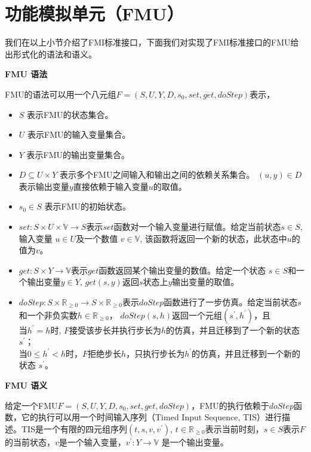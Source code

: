\section{功能模拟单元（FMU）}
我们在以上小节介绍了FMI标准接口，下面我们对实现了FMI标准接口的FMU给出形式化的语法和语义。
\begin{define}
\textbf{FMU 语法}

FMU的语法可以用一个八元组$F=(S,U,Y,D,s_{0},set,get,doStep)$表示，
\end{define}
\begin{itemize}
\item
$S$ 表示FMU的状态集合。
\item
$U$ 表示FMU的输入变量集合。
\item
$Y$ 表示FMU的输出变量集合。
\item
$D \subseteq U \times Y$ 表示多个FMU之间输入和输出之间的依赖关系集合。 $(u,y) \in D $表示输出变量$y$直接依赖于输入变量$u$的取值。 
\item
$s_{0} \in S$ 表示FMU的初始状态。
\item
$set : S \times U \times \mathbb{V} \rightarrow S$表示$set$函数对一个输入变量进行赋值。给定当前状态$s \in S$, 输入变量 $u \in U$及一个数值 $v \in \mathbb{V}$, 该函数将返回一个新的状态，此状态中$u$的值为$v$。
\item
$get : S \times Y \rightarrow \mathbb{V}$表示$get$函数返回某个输出变量的数值。给定一个状态 $s \in S$和一个输出变量$y \in Y$, $get(s,y)$返回$s$状态上$y$输出变量的取值。
\item
$doStep : S \times \mathbb{R}_{\geqslant{0}} \rightarrow S \times \mathbb{R}_{\geqslant{0}}$表示$doStep$函数进行了一步仿真。给定当前状态$s$和一个非负实数$h \in \mathbb{R}_{\geqslant{0}}$， $doStep(s,h)$返回一个元组$(s^{\prime},h^{\prime})$，且
\\
    当$h^{\prime} = h$时, $F$接受该步长并执行步长为$h$的仿真，并且迁移到了一个新的状态 $s^{\prime}$；
\\
    当$0 \leqslant h^{\prime} < h$时，$F$拒绝步长$h$，只执行步长为$h^{\prime}$的仿真，并且迁移到一个新的状态 $s^{\prime}$。
\end{itemize}
\begin{define}
\textbf{FMU 语义}
\end{define} 
给定一个FMU$F=(S,U,Y,D,s_{0},set,get,doStep)$，FMU的执行依赖于$doStep$函数，它的执行可以用一个时间输入序列（Timed Input Sequence, TIS）进行描述。TIS是一个有限的四元组序列$(t,s,v,v^{\prime})$, $t \in \mathbb{R}_{\geqslant{0}}$表示当前时刻，$s \in S$表示$F$的当前状态，$v$是一个输入变量，$v^{\prime} : Y \rightarrow \mathbb{V}$ 是一个输出变量。
 
